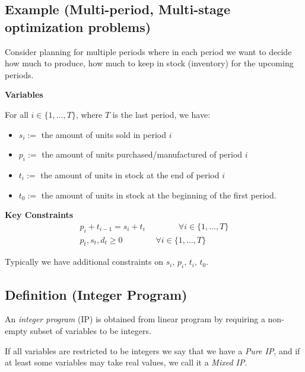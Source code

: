 \subsection{Example (Multi-period, Multi-stage optimization problems)}
Consider planning for multiple periods where in each period we
want to decide how much to produce, how much to keep in stock
(inventory) for the upcoming periods.

\textbf{Variables}

For all $ i\in \{1,\ldots,T\} $, where $ T $ is the last period, we have:
\begin{itemize}
    \item $ s_i:= $ the amount of units sold in period $ i $
    \item $ p_i:= $ the amount of units purchased/manufactured of period $ i $
    \item $ t_i:= $ the amount of units in stock at the end of period $ i $
    \item $ t_0:= $ the amount of units in stock at the beginning of the first period.
\end{itemize}
\textbf{Key Constraints}
\begin{align*}
    p_i+t_{i-1}=s_{i}+t_i \qquad\qquad \forall i\in \{1,\dots,T\}\\
    p_t,s_t,d_t\ge 0 \qquad\qquad \forall i\in \{1,\dots,T\}
\end{align*}
\begin{remark}
    Typically we have additional constraints on $s_i,\,p_i,\,t_i,\,t_0$.
\end{remark}

\begin{defbox}
    \subsection{Definition (Integer Program)}
    An \emph{integer program} (IP) is obtained from linear program 
    by requiring a non-empty subset of variables to be integers.
\end{defbox}

\begin{remark}
    If all variables are restricted to be integers we say that we
    have a \emph{Pure IP}, and if at least some variables may take
    real values, we call it a \emph{Mixed IP}.
\end{remark}
